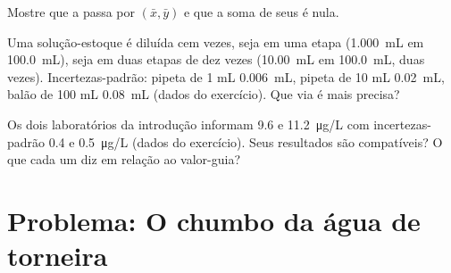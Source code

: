 \begin{exercise}[$\star\star\star$]\label{exo:b2:measurement-statistics:10}
Mostre que a  passa por $(\bar x, \bar y)$ e que a soma de seus  é nula.
\end{exercise}

\begin{exercise}[$\star\star\star$]\label{exo:b2:measurement-statistics:11}
Uma solução-estoque é diluída cem vezes, seja em uma etapa (\qty{1.000}{mL} em \qty{100.0}{mL}), seja
em duas etapas de dez vezes (\qty{10.00}{mL} em \qty{100.0}{mL}, duas vezes). Incertezas-padrão: pipeta
de 1 mL \qty{0.006}{mL}, pipeta de 10 mL \qty{0.02}{mL}, balão de 100 mL \qty{0.08}{mL} (dados do
exercício). Que via é mais precisa?
\end{exercise}

\begin{exercise}[$\star\star\star$]\label{exo:b2:measurement-statistics:12}
Os dois laboratórios da introdução informam 9.6 e \qty{11.2}{\micro g/L} com incertezas-padrão
0.4 e \qty{0.5}{\micro g/L} (dados do exercício). Seus resultados são compatíveis? O que cada um diz em
relação ao valor-guia?
\end{exercise}

\section{Problema: O chumbo da água de torneira}

